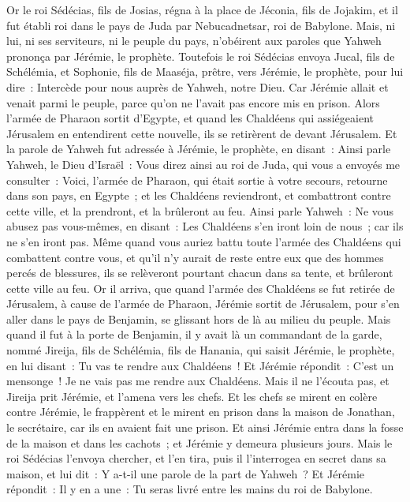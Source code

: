 \begin{multicols}{2}
\VerseOne{}Or le roi Sédécias, fils de Josias, régna à la place de Jéconia, fils de Jojakim, et il fut établi roi dans le pays de Juda par Nebucadnetsar, roi de Babylone.
Mais, ni lui, ni ses serviteurs, ni le peuple du pays, n'obéirent aux paroles que Yahweh prononça par Jérémie, le prophète.
Toutefois le roi Sédécias envoya Jucal, fils de Schélémia, et Sophonie, fils de Maaséja, prêtre, vers Jérémie, le prophète, pour lui dire~: Intercède pour nous auprès de Yahweh, notre Dieu.
Car Jérémie allait et venait parmi le peuple, parce qu'on ne l'avait pas encore mis en prison.
Alors l'armée de Pharaon sortit d'Egypte, et quand les Chaldéens qui assiégeaient Jérusalem en entendirent cette nouvelle, ils se retirèrent de devant Jérusalem.
Et la parole de Yahweh fut adressée à Jérémie, le prophète, en disant~:
Ainsi parle Yahweh, le Dieu d'Israël~: Vous direz ainsi au roi de Juda, qui vous a envoyés me consulter~: Voici, l'armée de Pharaon, qui était sortie à votre secours, retourne dans son pays, en Egypte~;
et les Chaldéens reviendront, et combattront contre cette ville, et la prendront, et la brûleront au feu.
Ainsi parle Yahweh~: Ne vous abusez pas vous-mêmes, en disant~: Les Chaldéens s'en iront loin de nous~; car ils ne s'en iront pas.
Même quand vous auriez battu toute l'armée des Chaldéens qui combattent contre vous, et qu'il n'y aurait de reste entre eux que des hommes percés de blessures, ils se relèveront pourtant chacun dans sa tente, et brûleront cette ville au feu.
Or il arriva, que quand l'armée des Chaldéens se fut retirée de Jérusalem, à cause de l'armée de Pharaon,
Jérémie sortit de Jérusalem, pour s'en aller dans le pays de Benjamin, se glissant hors de là au milieu du peuple.
Mais quand il fut à la porte de Benjamin, il y avait là un commandant de la garde, nommé Jireija, fils de Schélémia, fils de Hanania, qui saisit Jérémie, le prophète, en lui disant~: Tu vas te rendre aux Chaldéens~!
Et Jérémie répondit~: C'est un mensonge~! Je ne vais pas me rendre aux Chaldéens. Mais il ne l'écouta pas, et Jireija prit Jérémie, et l'amena vers les chefs.
Et les chefs se mirent en colère contre Jérémie, le frappèrent et le mirent en prison dans la maison de Jonathan, le secrétaire, car ils en avaient fait une prison.
Et ainsi Jérémie entra dans la fosse de la maison et dans les cachots~; et Jérémie y demeura plusieurs jours.
Mais le roi Sédécias l'envoya chercher, et l'en tira, puis il l'interrogea en secret dans sa maison, et lui dit~: Y a-t-il une parole de la part de Yahweh~? Et Jérémie répondit~: Il y en a une~: Tu seras livré entre les mains du roi de Babylone.

\end{multicols}
